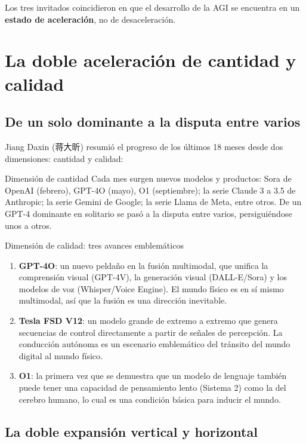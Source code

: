 \documentclass[a4paper]{article}
\begin{document}
Los tres invitados coincidieron en que el desarrollo de la AGI se encuentra en un \textbf{estado de aceleración}, no de desaceleración.

\section{La doble aceleración de cantidad y calidad}

\subsection{De un solo dominante a la disputa entre varios}

Jiang Daxin (蒋大昕) resumió el progreso de los últimos 18 meses desde dos dimensiones: cantidad y calidad:

\begin{knowledgebox}{Dimensión de cantidad}
Cada mes surgen nuevos modelos y productos: Sora de OpenAI (febrero), GPT-4O (mayo), O1 (septiembre); la serie Claude 3 a 3.5 de Anthropic; la serie Gemini de Google; la serie Llama de Meta, entre otros. De un GPT-4 dominante en solitario se pasó a la disputa entre varios, persiguiéndose unos a otros.
\end{knowledgebox}

\begin{importantbox}{Dimensión de calidad: tres avances emblemáticos}
\begin{enumerate}
\item \textbf{GPT-4O}: un nuevo peldaño en la fusión multimodal, que unifica la comprensión visual (GPT-4V), la generación visual (DALL-E/Sora) y los modelos de voz (Whisper/Voice Engine). El mundo físico es en sí mismo multimodal, así que la fusión es una dirección inevitable.
\item \textbf{Tesla FSD V12}: un modelo grande de extremo a extremo que genera secuencias de control directamente a partir de señales de percepción. La conducción autónoma es un escenario emblemático del tránsito del mundo digital al mundo físico.
\item \textbf{O1}: la primera vez que se demuestra que un modelo de lenguaje también puede tener una capacidad de pensamiento lento (Sistema 2) como la del cerebro humano, lo cual es una condición básica para inducir el mundo.
\end{enumerate}
\end{importantbox}

\subsection{La doble expansión vertical y horizontal}
\end{document}
